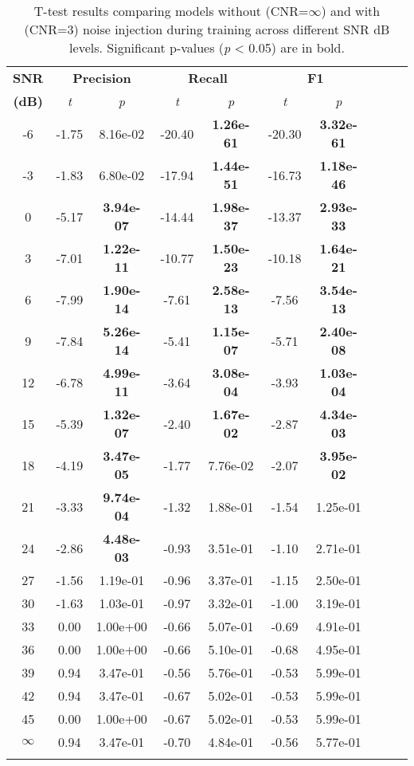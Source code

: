 \documentclass{article}
\begin{document}
\begin{table}[h!]
\centering
\caption{T-test results comparing models without (CNR=$\infty$) and with (CNR=3) noise injection during training across different SNR dB levels. Significant p-values (\textit{p} < 0.05) are in bold.}
\scriptsize
\begin{tabular}{@{}c ccc ccc ccc@{}} %
\toprule
\textbf{SNR} & \multicolumn{2}{c}{\textbf{Precision}} & \multicolumn{2}{c}{\textbf{Recall}} & \multicolumn{2}{c}{\textbf{F1}} \\ 
\textbf{(dB)} & \textit{t} & \textit{p} & \textit{t} & \textit{p} & \textit{t} & \textit{p} \\
\midrule
-6  & -1.75  & 8.16e-02  & -20.40  & \textbf{1.26e-61}  & -20.30  & \textbf{3.32e-61} \\
-3  & -1.83  & 6.80e-02  & -17.94  & \textbf{1.44e-51}  & -16.73  & \textbf{1.18e-46} \\
0   & -5.17  & \textbf{3.94e-07}  & -14.44  & \textbf{1.98e-37}  & -13.37  & \textbf{2.93e-33} \\
3   & -7.01  & \textbf{1.22e-11}  & -10.77  & \textbf{1.50e-23}  & -10.18  & \textbf{1.64e-21} \\
6   & -7.99  & \textbf{1.90e-14}  & -7.61   & \textbf{2.58e-13}  & -7.56   & \textbf{3.54e-13} \\
9   & -7.84  & \textbf{5.26e-14}  & -5.41   & \textbf{1.15e-07}  & -5.71   & \textbf{2.40e-08} \\
12  & -6.78  & \textbf{4.99e-11}  & -3.64   & \textbf{3.08e-04}  & -3.93   & \textbf{1.03e-04} \\
15  & -5.39  & \textbf{1.32e-07}  & -2.40   & \textbf{1.67e-02}  & -2.87   & \textbf{4.34e-03} \\
18  & -4.19  & \textbf{3.47e-05}  & -1.77   & 7.76e-02  & -2.07   & \textbf{3.95e-02} \\
21  & -3.33  & \textbf{9.74e-04}  & -1.32   & 1.88e-01  & -1.54   & 1.25e-01 \\
24  & -2.86  & \textbf{4.48e-03}  & -0.93   & 3.51e-01  & -1.10   & 2.71e-01 \\
27  & -1.56  & 1.19e-01  & -0.96   & 3.37e-01  & -1.15   & 2.50e-01 \\
30  & -1.63  & 1.03e-01  & -0.97   & 3.32e-01  & -1.00   & 3.19e-01 \\
33  & 0.00   & 1.00e+00  & -0.66   & 5.07e-01  & -0.69   & 4.91e-01 \\
36  & 0.00   & 1.00e+00  & -0.66   & 5.10e-01  & -0.68   & 4.95e-01 \\
39  & 0.94   & 3.47e-01  & -0.56   & 5.76e-01  & -0.53   & 5.99e-01 \\
42  & 0.94   & 3.47e-01  & -0.67   & 5.02e-01  & -0.53   & 5.99e-01 \\
45  & 0.00   & 1.00e+00  & -0.67   & 5.02e-01  & -0.53   & 5.99e-01 \\
$\infty$ & 0.94   & 3.47e-01  & -0.70   & 4.84e-01  & -0.56   & 5.77e-01 \\
\bottomrule
\label{tab:1}
\end{tabular}
\end{table}
\end{document}
